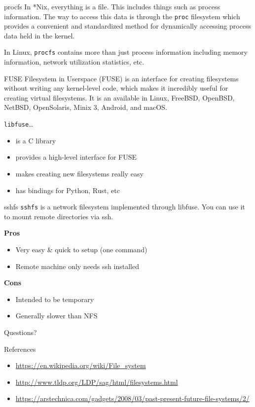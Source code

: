 \documentclass{lug}
\begin{document}
\begin{frame}{procfs}
    In *Nix, everything is a file. This includes things such as process
    information. The way to access this data is through the \texttt{proc}
    filesystem which provides a convenient and standardized method for
    dynamically accessing process data held in the kernel.

    In Linux, \texttt{procfs} contains more than just process information
    including memory information, network utilization statistics, etc.
\end{frame}

\begin{frame}{FUSE}
Filesystem in Userspace (FUSE) is an interface for creating filesystems
without writing any kernel-level code, which makes it incredibly useful for
creating virtual filesystems. It is an available in Linux, FreeBSD, OpenBSD,
NetBSD, OpenSolaris, Minix 3, Android, and macOS.

\texttt{libfuse}\ldots \begin{itemize}
    \item is a C library
    \item provides a high-level interface for FUSE
    \item makes creating new filesystems really easy
    \item has bindings for Python, Rust, etc
\end{itemize}
\end{frame}

\begin{frame}{sshfs}
\texttt{sshfs} is a network filesystem implemented through libfuse. You can
use it to mount remote directories via ssh.

\textbf{Pros}\begin{itemize}
    \item Very easy \& quick to setup (one command)
    \item Remote machine only needs ssh installed
\end{itemize}

\textbf{Cons}\begin{itemize}
    \item Intended to be temporary
    \item Generally slower than NFS
\end{itemize}
\end{frame}

\begin{frame}[standout]
    \Huge
    Questions?
\end{frame}

\begin{frame}{References}
    \begin{itemize}
        \item \url{https://en.wikipedia.org/wiki/File_system}
        \item \url{http://www.tldp.org/LDP/sag/html/filesystems.html}
        \item \url{https://arstechnica.com/gadgets/2008/03/past-present-future-file-systems/2/}
    \end{itemize}
\end{frame}
\end{document}
